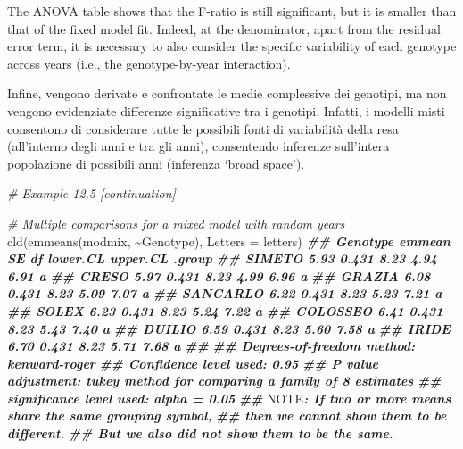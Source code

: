 \documentclass[
  12pt,
]{book}
\newenvironment{Shaded}{\begin{snugshade}}{\end{snugshade}}
\newcommand{\AlertTok}[1]{\textcolor[rgb]{0.94,0.16,0.16}{#1}}
\newcommand{\AttributeTok}[1]{\textcolor[rgb]{0.77,0.63,0.00}{#1}}
\newcommand{\CommentTok}[1]{\textcolor[rgb]{0.56,0.35,0.01}{\textit{#1}}}
\newcommand{\DocumentationTok}[1]{\textcolor[rgb]{0.56,0.35,0.01}{\textbf{\textit{#1}}}}
\newcommand{\FunctionTok}[1]{\textcolor[rgb]{0.00,0.00,0.00}{#1}}
\newcommand{\NormalTok}[1]{#1}
\newcommand{\SpecialCharTok}[1]{\textcolor[rgb]{0.00,0.00,0.00}{#1}}
\begin{document}
The ANOVA table shows that the F-ratio is still significant, but it is smaller than that of the fixed model fit. Indeed, at the denominator, apart from the residual error term, it is necessary to also consider the specific variability of each genotype across years (i.e., the genotype-by-year interaction).

Infine, vengono derivate e confrontate le medie complessive dei genotipi, ma non vengono evidenziate differenze significative tra i genotipi. Infatti, i modelli misti consentono di considerare tutte le possibili fonti di variabilità della resa (all'interno degli anni e tra gli anni), consentendo inferenze sull'intera popolazione di possibili anni (inferenza `broad space').

\begin{Shaded}
\begin{Highlighting}[]
\CommentTok{\# Example 12.5 [continuation]}

\CommentTok{\# Multiple comparisons for a mixed model with random years}
\FunctionTok{cld}\NormalTok{(}\FunctionTok{emmeans}\NormalTok{(modmix, }\SpecialCharTok{\textasciitilde{}}\NormalTok{Genotype), }\AttributeTok{Letters =}\NormalTok{ letters)}
\DocumentationTok{\#\#  Genotype emmean    SE   df lower.CL upper.CL .group}
\DocumentationTok{\#\#  SIMETO     5.93 0.431 8.23     4.94     6.91  a    }
\DocumentationTok{\#\#  CRESO      5.97 0.431 8.23     4.99     6.96  a    }
\DocumentationTok{\#\#  GRAZIA     6.08 0.431 8.23     5.09     7.07  a    }
\DocumentationTok{\#\#  SANCARLO   6.22 0.431 8.23     5.23     7.21  a    }
\DocumentationTok{\#\#  SOLEX      6.23 0.431 8.23     5.24     7.22  a    }
\DocumentationTok{\#\#  COLOSSEO   6.41 0.431 8.23     5.43     7.40  a    }
\DocumentationTok{\#\#  DUILIO     6.59 0.431 8.23     5.60     7.58  a    }
\DocumentationTok{\#\#  IRIDE      6.70 0.431 8.23     5.71     7.68  a    }
\DocumentationTok{\#\# }
\DocumentationTok{\#\# Degrees{-}of{-}freedom method: kenward{-}roger }
\DocumentationTok{\#\# Confidence level used: 0.95 }
\DocumentationTok{\#\# P value adjustment: tukey method for comparing a family of 8 estimates }
\DocumentationTok{\#\# significance level used: alpha = 0.05 }
\DocumentationTok{\#\# }\AlertTok{NOTE}\DocumentationTok{: If two or more means share the same grouping symbol,}
\DocumentationTok{\#\#       then we cannot show them to be different.}
\DocumentationTok{\#\#       But we also did not show them to be the same.}
\end{Highlighting}
\end{Shaded}
\end{document}
